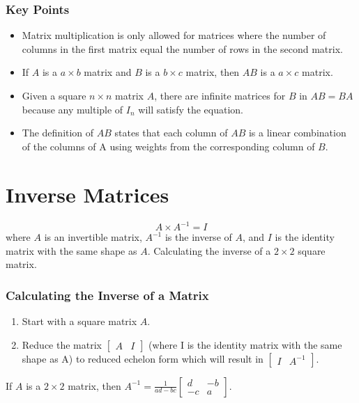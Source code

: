 \documentclass{article}
\begin{document}
\subsubsection*{Key Points}
\begin{itemize}
    \item Matrix multiplication is only allowed for matrices where the number of columns in the first matrix equal the number of rows in the second matrix.
    \item If $A$ is a $a\times b$ matrix and $B$ is a $b \times c$ matrix, then $AB$ is a $a \times c$ matrix.
    \item Given a square $n\times n$ matrix $A$, there are infinite matrices for $B$ in $AB=BA$ because any multiple of $I_n$ will satisfy the equation.
    \item The definition of $AB$ states that each column of $AB$ is a linear combination of the columns of A using weights from the corresponding column of $B$.
\end{itemize}

\section*{Inverse Matrices}
\[A\times A^{-1}=I\]
where $A$ is an invertible matrix, $A^{-1}$ is the inverse of $A$, and $I$ is the identity matrix with the same shape as $A$.
Calculating the inverse of a $2\times 2$ square matrix.

\subsubsection*{Calculating the Inverse of a Matrix}
\begin{enumerate}
    \item Start with a square matrix $A$.
    \item Reduce the matrix $\begin{bmatrix} A & I \end{bmatrix}$ (where I is the identity matrix with the same shape as A) to reduced echelon form which will result in $\begin{bmatrix} I & A^{-1} \end{bmatrix}$.
\end{enumerate}

If $A$ is a $2\times 2$ matrix, then $A^{-1}=\frac{1}{ad-bc}\begin{bmatrix} d & -b \\ -c & a \end{bmatrix}$. \\
\end{document}
